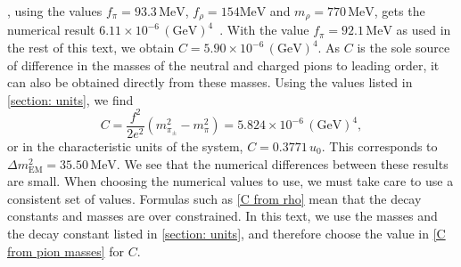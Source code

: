 %
\citeauthor{urechVirtualPhotonsChiral1995}, using the values $f_\pi = 93.3\, \text{MeV}$, $f_\rho = 154 \text{MeV}$ and $m_\rho = 770\, \text{MeV}$, gets the numerical result $6.11\times 10^{-6} \, (\text{GeV})^4$~\autocite{urechVirtualPhotonsChiral1995}.
With the value $f_\pi = 92.1\,\text{MeV}$ as used in the rest of this text, we obtain $C = 5.90\times 10^{-6} \, (\text{GeV})^4$.
As $C$ is the sole source of difference in the masses of the neutral and charged pions to leading order, it can also be obtained directly from these masses.
Using the values listed in \autoref{section: units}, we find
%
\begin{equation}
    \label{C from pion masses}
    C= \frac{f^2}{2 e^2}(m_{\pi_\pm}^2 - m_{\pi}^2) = 5.824 \times 10^{-6} \, (\text{GeV})^4 ,
\end{equation}
%
or in the characteristic units of the system, $C = 0.3771 \, u_0$.
This corresponds to $\Delta m_\text{EM}^2 = 35.50 \, \text{MeV}$.
We see that the numerical differences between these results are small.
When choosing the numerical values to use, we must take care to use a consistent set of values.
Formulas such as \autoref{C from rho} mean that the decay constants and masses are over constrained.
In this text, we use the masses and the decay constant listed in \autoref{section: units}, and therefore choose the value in \autoref{C from pion masses} for $C$.

